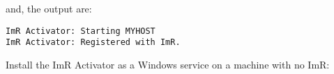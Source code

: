 
and, the output are:

\begin{verbatim}
ImR Activator: Starting MYHOST
ImR Activator: Registered with ImR.
\end{verbatim}

Install the ImR Activator as a Windows service on a machine with no ImR:



